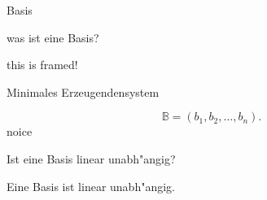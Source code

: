 \documentclass[class=article, crop=false]{standalone}
\begin{document}
\begin{zettel}{Basis}
\begin{flashcard}
\begin{question}
    was ist eine Basis?
\end{question}


\begin{mdframed}
    this is framed!
\end{mdframed}
    Minimales Erzeugendensystem
    
\[
    \mathbb{B} = (b_1 , b_2 , \dots , b_n )
.\]
noice
\end{flashcard}

\begin{flashcard}
\begin{question}
    Ist eine Basis linear unabh"angig?
\end{question}

Eine Basis ist linear unabh"angig.
\end{flashcard}

\end{zettel}
\end{document}
